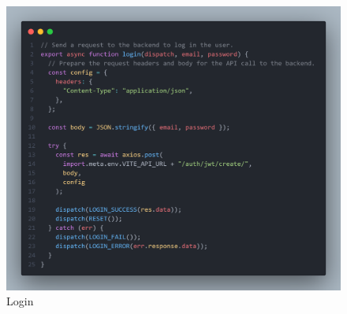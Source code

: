 \begin{figure}[h!]
	\centering
	\includegraphics[max height=\textheight,max width=\textwidth]{figures/srccode/Login.png}
	\caption{Login}
\end{figure}


